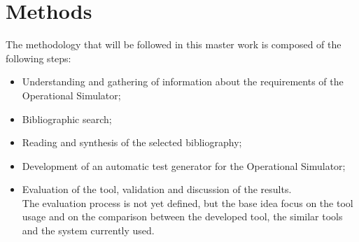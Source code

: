 \documentclass[a4paper,12pt]{article}
\begin{document}
\section{\Large Methods}
The methodology that will be followed in this master work is composed of the following steps:

\begin{itemize}
\item Understanding and gathering of information about the requirements of the Operational Simulator;
\item Bibliographic search;
\item Reading and synthesis of the selected bibliography;
\item Development of an automatic test generator for the Operational Simulator;
\item Evaluation of the tool, validation and discussion of the results.\\[6pt]
The evaluation process is not yet defined, but the base idea focus on the tool usage and on the comparison between the developed tool, the similar tools
and the system currently used.
\end{itemize}
\end{document}
